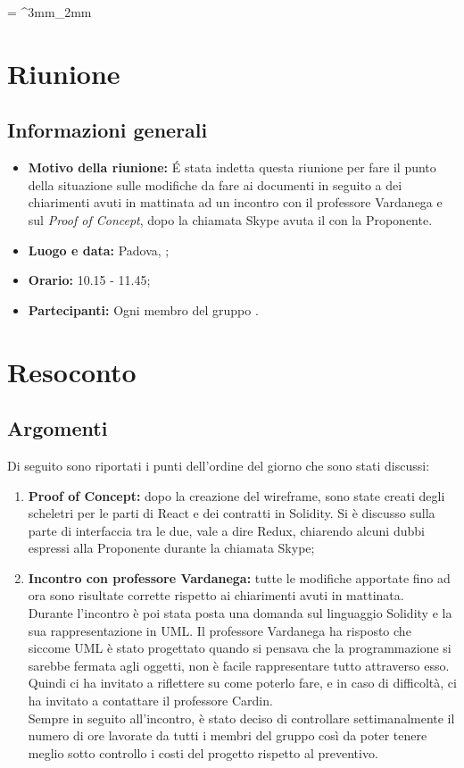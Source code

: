 \documentclass[VER-2018-02-19.tex]{subfiles}
\begin{document}
\tabulinesep = ^3mm_2mm
\chapter{Riunione}
\section{Informazioni generali}
\begin{itemize}
	\item \textbf{Motivo della riunione:} \'{E} stata indetta questa riunione per fare il punto della situazione sulle modifiche da fare ai documenti in seguito a dei chiarimenti avuti in mattinata ad un incontro con il professore Vardanega e sul \textit{Proof of Concept}, dopo la chiamata Skype avuta il  con la Proponente.
	\item \textbf{Luogo e data:} Padova, ;
	\item \textbf{Orario:} 10.15 - 11.45;
	\item \textbf{Partecipanti:} Ogni membro del gruppo \gruppo.
\end{itemize}


\chapter{Resoconto}

\section{Argomenti}
Di seguito sono riportati i punti dell'ordine del giorno che sono stati discussi:
\begin{enumerate}
	\item \textbf{Proof of Concept:} dopo la creazione del wireframe, sono state creati degli scheletri per le parti di React e dei contratti in Solidity. Si è discusso sulla parte di interfaccia tra le due, vale a dire Redux, chiarendo alcuni dubbi espressi alla Proponente durante la chiamata Skype;
	\item \textbf{Incontro con professore Vardanega:} tutte le modifiche apportate fino ad ora sono risultate corrette rispetto ai chiarimenti avuti in mattinata.\\
	Durante l'incontro è poi stata posta una domanda sul linguaggio Solidity e la sua rappresentazione in UML. Il professore Vardanega ha risposto che siccome UML è stato progettato quando si pensava che la programmazione si sarebbe fermata agli oggetti, non è facile rappresentare tutto attraverso esso. Quindi ci ha invitato a riflettere su come poterlo fare, e in caso di difficoltà, ci ha invitato a contattare il professore Cardin.\\
	Sempre in seguito all'incontro, è stato deciso di controllare settimanalmente il numero di ore lavorate da tutti i membri del gruppo così da poter tenere meglio sotto controllo i costi del progetto rispetto al preventivo.
\end{enumerate}
\end{document}
